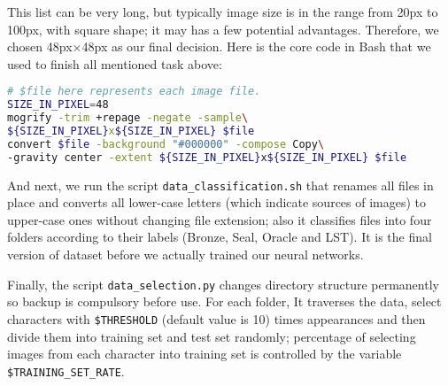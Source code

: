 This list can be very long, but typically image size is in the range from 20px to 100px, with square shape; it may has a few potential advantages. Therefore, we chosen 48px$ \times $48px as our final decision. Here is the core code in Bash that we used to finish all mentioned task above:
\begin{lstlisting}[language = bash, caption = Image Preprocessing]
# $file here represents each image file.
SIZE_IN_PIXEL=48
mogrify -trim +repage -negate -sample\
${SIZE_IN_PIXEL}x${SIZE_IN_PIXEL} $file
convert $file -background "#000000" -compose Copy\
-gravity center -extent ${SIZE_IN_PIXEL}x${SIZE_IN_PIXEL} $file
\end{lstlisting}

And next, we run the script \texttt{data\_classification.sh} that renames all files in place and converts all lower-case letters (which indicate sources of images) to upper-case ones without changing file extension; also it classifies files into four folders according to their labels (Bronze, Seal, Oracle and LST). It is the final version of dataset before we actually trained our neural networks.

Finally, the script \texttt{data\_selection.py} changes directory structure permanently so backup is compulsory before use. For each folder, It traverses the data, select characters with \texttt{\$THRESHOLD} (default value is 10) times appearances and then divide them into training set and test set randomly; percentage of selecting images from each character into training set is controlled by the variable \texttt{\$TRAINING\_SET\_RATE}.